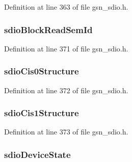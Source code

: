 Definition at line 363 of file gsn\_\-sdio.h.

\hypertarget{a00216_ad60c142866b2430f69242ce7a3232d39}{
\subsubsection[{sdioBlockReadSemId}]{ {\bf sdioBlockReadSemId}}}
\label{a00216_ad60c142866b2430f69242ce7a3232d39}


Definition at line 371 of file gsn\_\-sdio.h.

\hypertarget{a00216_a0bf26a6eea35d59f303591cd6501afa0}{
\subsubsection[{sdioCis0Structure}]{ {\bf sdioCis0Structure}}}
\label{a00216_a0bf26a6eea35d59f303591cd6501afa0}


Definition at line 372 of file gsn\_\-sdio.h.

\hypertarget{a00216_af0ecceae9290e2a184c9f8a9b7b98240}{
\subsubsection[{sdioCis1Structure}]{ {\bf sdioCis1Structure}}}
\label{a00216_af0ecceae9290e2a184c9f8a9b7b98240}


Definition at line 373 of file gsn\_\-sdio.h.

\hypertarget{a00216_afcbed2858d28642dec8c21f42bf0ccb0}{
\subsubsection[{sdioDeviceState}]{ {\bf sdioDeviceState}}}
\label{a00216_afcbed2858d28642dec8c21f42bf0ccb0}


